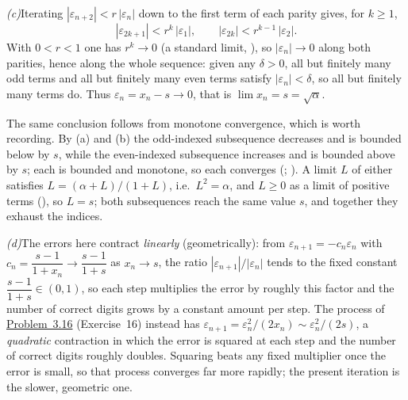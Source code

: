 \documentclass[main.tex]{subfiles}
\begin{document}
\begin{SolutionBlue}
\emph{(c)}\quad Iterating $|\varepsilon_{n+2}|<r\,|\varepsilon_{n}|$ down to the first term of each
parity gives, for $k\ge1$,
\[
|\varepsilon_{2k+1}|<r^{k}\,|\varepsilon_{1}|,\qquad |\varepsilon_{2k}|<r^{k-1}\,|\varepsilon_{2}|.
\]
With $0<r<1$ one has $r^{k}\to0$ (a standard limit, ), so $|\varepsilon_{n}|\to0$
along both parities, hence along the whole sequence: given any $\delta>0$, all but finitely many
odd terms and all but finitely many even terms satisfy $|\varepsilon_{n}|<\delta$, so all but
finitely many terms do. Thus $\varepsilon_{n}=x_{n}-s\to0$, that is $\lim x_{n}=s=\sqrt{\alpha}$.

The same conclusion follows from monotone convergence, which is worth recording. By (a) and (b) the
odd-indexed subsequence decreases and is bounded below by $s$, while the even-indexed subsequence
increases and is bounded above by $s$; each is bounded and monotone, so each converges
(; ). A limit $L$ of either
satisfies $L=(\alpha+L)/(1+L)$, i.e.\ $L^{2}=\alpha$, and $L\ge0$ as a limit of positive terms
(), so $L=s$; both subsequences reach the same value $s$, and together they exhaust the
indices.

\emph{(d)}\quad The errors here contract \emph{linearly} (geometrically): from
$\varepsilon_{n+1}=-c_{n}\varepsilon_{n}$ with $c_{n}=\dfrac{s-1}{1+x_{n}}\to\dfrac{s-1}{1+s}$ as
$x_{n}\to s$, the ratio $|\varepsilon_{n+1}|/|\varepsilon_{n}|$ tends to the fixed constant
$\dfrac{s-1}{1+s}\in(0,1)$, so each step multiplies the error by roughly this factor and the number of
correct digits grows by a constant amount per step. The process of
\hyperlink{prob:3.16}{Problem~3.16} (Exercise~16) instead has
$\varepsilon_{n+1}=\varepsilon_{n}^{2}/(2x_{n})\sim\varepsilon_{n}^{2}/(2s)$, a \emph{quadratic}
contraction in which the error is squared at each step and the number of correct digits roughly doubles.
Squaring beats any fixed multiplier once the error is small, so that process converges far more rapidly;
the present iteration is the slower, geometric one.
\end{SolutionBlue}
\end{document}
